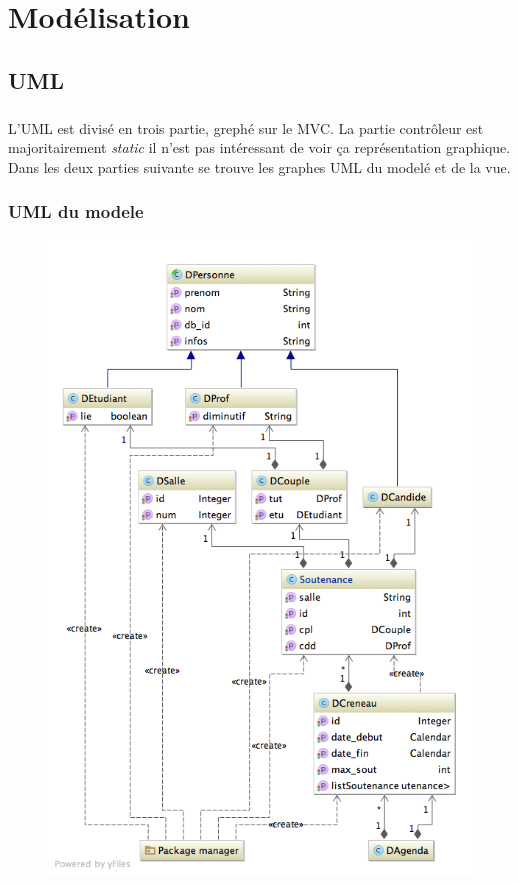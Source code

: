 \documentclass[a4paper,10pt]{report}
\begin{document}
\chapter{Modélisation}

	\section{UML}

		\paragraph*{}
		L'UML est divisé en trois partie, grephé sur le MVC. La partie contrôleur est majoritairement \textit{static} il n'est pas intéressant de voir ça représentation graphique. Dans les deux parties suivante se trouve les graphes UML du modelé et de la vue.

		\subsection{UML du modele}

			\begin{figure}[h!]
				\includegraphics[scale=.5]{uml_don.png}	
				\centering
			\end{figure}
\end{document}
